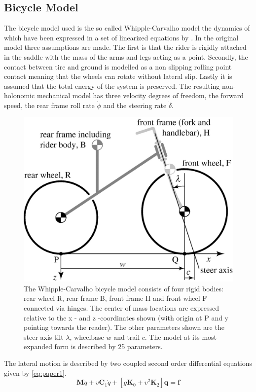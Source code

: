 \subsection{Bicycle Model}
The bicycle model used is the so called Whipple-Carvalho model the dynamics of which have been expressed in a set of linearized equations by \citet{meijaard2007linearized}. In the original model three assumptions are made. The first is that the rider is rigidly attached in the saddle with the mass of the arms and legs acting as a point. Secondly, the contact between tire and ground is modelled as a non slipping rolling point contact meaning that the wheels can rotate without lateral slip. Lastly it is assumed that the total energy of the system is preserved. The resulting non-holonomic mechanical model has three velocity degrees of freedom, the forward speed, the rear frame roll rate \ensuremath{\dot{\phi}} and the steering rate \ensuremath{\dot{\delta}}.
\begin{figure}[ht]
    \centering
    \includegraphics[scale=0.3]{images/figure3_1.png}
    \caption{ The Whipple-Carvalho bicycle model consists of four rigid bodies: rear wheel R, rear frame B, front frame H and front wheel F connected via hinges. The center of mass locations are expressed relative to the x - and z -coordinates shown (with origin at P and y pointing towards the reader). The other parameters shown are the steer axis tilt \ensuremath{\lambda}, wheelbase \ensuremath{w} and trail \ensuremath{c}. The model at its most expanded form is described by 25 parameters.\cite{meijaard2007linearized}}
    \label{fig:figure2}
\end{figure}
The lateral motion is described by  two coupled second order differential equations given by \cref{eq:paper1}.
\begin{equation}
    \mathbf{M} \ddot{q}+v \mathbf{C}_{1} \dot{q}+\left[g \mathbf{K}_{0}+v^{2} \mathbf{K}_{2}\right] \mathbf{q}=\mathbf{f}
    \label{eq:paper1}
\end{equation}

